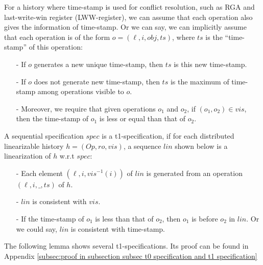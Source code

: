 For a history where time-stamp is used for conflict resolution, such as RGA and last-write-win register (LWW-register), we can assume that each operation also gives the information of time-stamp. Or we can say, we can implicitly assume that each operation is of the form $o = (\ell,i,\mathit{obj},\mathit{ts})$, where $\mathit{ts}$ is the ``time-stamp'' of this operation: %

\begin{itemize}
\setlength{\itemsep}{0.5pt}
\item[-] If $o$ generates a new unique time-stamp, then $\mathit{ts}$ is this new time-stamp.

\item[-] If $o$ does not generate new time-stamp, then $\mathit{ts}$ is the maximum of time-stamp among operations visible to $o$.

\item[-] Moreover, we require that given operations $o_1$ and $o_2$, if $(o_1,o_2) \in \mathit{vis}$, then the time-stamp of $o_1$ is less or equal than that of $o_2$.
\end{itemize}


\begin{definition}[t1-specification]
\label{definition:t1-specification}
A sequential specification $\mathit{spec}$ is a t1-specification, if for each distributed linearizable history $h=(\mathit{Op},\mathit{ro},\mathit{vis})$, a sequence $\mathit{lin}$ shown below is a linearization of $h$ w.r.t $\mathit{spec}$:

\begin{itemize}
\setlength{\itemsep}{0.5pt}
\item[-] Each element $(\ell,i,\mathit{vis}^{-1}(i))$ of $\mathit{lin}$ is generated from an operation $(\ell,i,\_,\mathit{ts})$ of $h$.

\item[-] $\mathit{lin}$ is consistent with $\mathit{vis}$.

\item[-] If the time-stamp of $o_1$ is less than that of $o_2$, then $o_1$ is before $o_2$ in $\mathit{lin}$. Or we could say, $\mathit{lin}$ is consistent with time-stamp.
\end{itemize}
\end{definition}

The following lemma shows several t1-specifications. Its proof can be found in Appendix \ref{subsec:proof in subsection subsec t0 specification and t1 specification}


